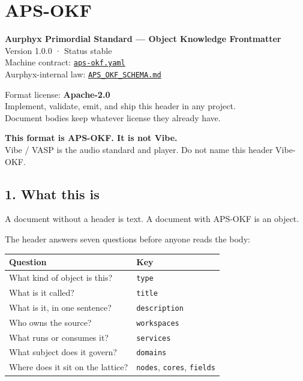 \section{APS-OKF}\label{aps-okf}

\textbf{Aurphyx Primordial Standard --- Object Knowledge Frontmatter}\\
Version 1.0.0 · Status stable\\
Machine contract: \href{./aps-okf.yaml}{\texttt{aps-okf.yaml}}\\
Aurphyx-internal law: \href{./APS_OKF_SCHEMA.md}{\texttt{APS\_OKF\_SCHEMA.md}}

Format license: \textbf{Apache-2.0}\\
Implement, validate, emit, and ship this header in any project.\\
Document bodies keep whatever license they already have.

\textbf{This format is APS-OKF. It is not Vibe.}\\
Vibe / VASP is the audio standard and player. Do not name this header Vibe-OKF.

\subsection{1. What this is}\label{what-this-is}

A document without a header is text. A document with APS-OKF is an object.

The header answers seven questions before anyone reads the body:

{\def\LTcaptype{none} %
\begin{longtable}[]{@{}ll@{}}
\toprule\noalign{}
Question & Key \\
\midrule\noalign{}
\endhead
\bottomrule\noalign{}
\endlastfoot
What kind of object is this? & \texttt{type} \\
What is it called? & \texttt{title} \\
What is it, in one sentence? & \texttt{description} \\
Who owns the source? & \texttt{workspaces} \\
What runs or consumes it? & \texttt{services} \\
What subject does it govern? & \texttt{domains} \\
Where does it sit on the lattice? & \texttt{nodes}, \texttt{cores}, \texttt{fields} \\
\end{longtable}
}

